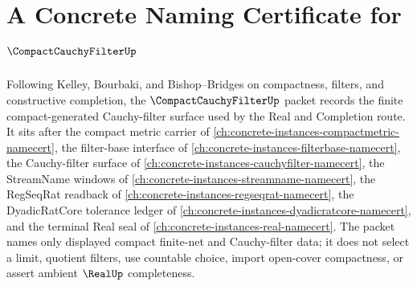 \chapter{A Concrete Naming Certificate for $\CompactCauchyFilterUp$}
\label{ch:concrete-instances-compact-cauchy-filter-namecert}

Following Kelley, Bourbaki, and Bishop--Bridges on compactness, filters, and constructive completion, the $\CompactCauchyFilterUp$ packet records the finite compact-generated Cauchy-filter surface used by the Real and Completion route. It sits after the compact metric carrier of \autoref{ch:concrete-instances-compactmetric-namecert}, the filter-base interface of \autoref{ch:concrete-instances-filterbase-namecert}, the Cauchy-filter surface of \autoref{ch:concrete-instances-cauchyfilter-namecert}, the StreamName windows of \autoref{ch:concrete-instances-streamname-namecert}, the RegSeqRat readback of \autoref{ch:concrete-instances-regseqrat-namecert}, the DyadicRatCore tolerance ledger of \autoref{ch:concrete-instances-dyadicratcore-namecert}, and the terminal Real seal of \autoref{ch:concrete-instances-real-namecert}. The packet names only displayed compact finite-net and Cauchy-filter data; it does not select a limit, quotient filters, use countable choice, import open-cover compactness, or assert ambient $\RealUp$ completeness.

